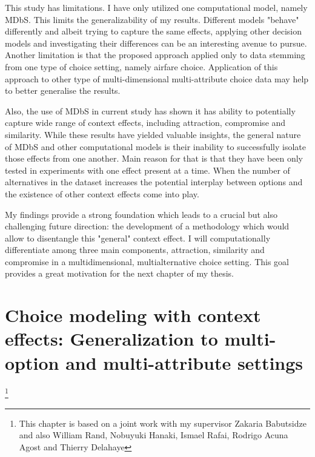 \documentclass[a4paper,12pt]{article}
\begin{document}
This study has limitations. I have only utilized one computational model, namely MDbS. This limits the generalizability of my results. Different models "behave" differently and albeit trying to capture the same effects, applying other decision models and investigating their differences can be an interesting avenue to pursue. Another limitation is that the proposed approach applied only to data stemming from one type of choice setting, namely airfare choice. Application of this approach to other type of multi-dimensional multi-attribute choice data may help to better generalise the results.

Also, the use of MDbS in current study has shown it has ability to potentially capture wide range of context effects, including attraction, compromise and similarity. While these results have yielded valuable insights, the general nature of MDbS and other computational models is their inability to successfully isolate those effects from one another. Main reason for that is that they have been only tested in experiments with one effect present at a time. When the number of alternatives in the dataset increases the potential interplay between options and the existence of other context effects come into play. 

My findings provide a strong foundation which leads to a crucial but also challenging future direction: the development of a methodology which would allow to disentangle this "general" context effect. I will computationally differentiate among three main components, attraction, similarity and compromise in a multidimensional, multialternative choice setting. This goal provides a great motivation for the next chapter of my thesis.

\newpage

\section{Choice modeling with context effects:
Generalization to multi-option and multi-attribute settings
}  \footnote{This chapter is based on a joint work with my supervisor Zakaria Babutsidze and also William Rand, Nobuyuki Hanaki, Ismael Rafai, Rodrigo Acuna Agost and Thierry Delahaye}
\end{document}
